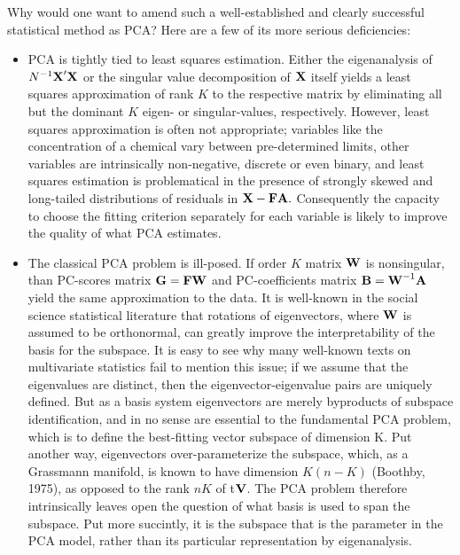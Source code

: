 \documentclass[12pt]{article}
\begin{document}
Why would one want to amend such a well-established and clearly successful statistical method as PCA?  Here are a few of its more serious deficiencies:
\begin{itemize}
  \item  PCA is tightly tied to least squares estimation.  Either the eigenanalysis of $N^{-1}\mbox{\bf X}'\mbox{\bf X}$ or the singular value decomposition of $\mbox{\bf X}$ itself yields a least squares approximation of rank $K$ to the respective matrix by eliminating all but the dominant $K$ eigen- or singular-values, respectively.  However, least squares approximation is often not appropriate; variables like the concentration of a chemical vary between pre-determined limits, other variables are intrinsically non-negative, discrete or even binary, and least squares estimation is problematical in the presence of strongly skewed and long-tailed distributions of residuals in $\mbox{\bf X} - \mbox{\bf F} \mbox{\bf A}.$  Consequently the capacity to choose the fitting criterion separately for each variable is likely to improve the quality of what PCA estimates.
  \item  The classical PCA problem is ill-posed.  If order $K$ matrix $\mbox{\bf W}$ is nonsingular, than PC-scores matrix $\mbox{\bf G} = \mbox{\bf F} \mbox{\bf W}$ and PC-coefficients matrix $\mbox{\bf B} = \mbox{\bf W}^{-1} \mbox{\bf A}$ yield the same approximation to the data.  It is well-known in the social science statistical literature that rotations of eigenvectors, where $\mbox{\bf W}$ is assumed to be orthonormal, can greatly improve the interpretability of the basis for the subspace.  It is easy to see why many well-known texts on multivariate statistics fail to mention this issue; if we assume that the eigenvalues are distinct, then the eigenvector-eigenvalue pairs are uniquely defined.  But as a basis system eigenvectors are merely byproducts of subspace identification, and in no sense are essential to the fundamental PCA problem, which is to define the best-fitting vector subspace of dimension K.  Put another way, eigenvectors over-parameterize the subspace, which, as a Grassmann manifold, is known to have dimension $K(n-K)$ (Boothby, 1975), as opposed to the rank $nK$ of t$\mbox{\bf V}$.  The PCA problem therefore intrinsically leaves open the question of what basis is used to span the subspace.  Put more succintly, it is the subspace that is the parameter in the PCA model, rather than its particular representation by eigenanalysis.

\end{itemize}
\end{document}
